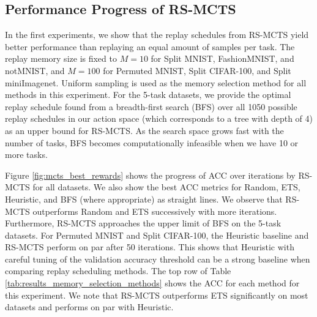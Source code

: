 
%


\subsection{Performance Progress of RS-MCTS}\label{paperC:sec:results_with_mcts}

In the first experiments, we show that the replay schedules from RS-MCTS yield better performance than replaying an equal amount of samples per task. 
The replay memory size is fixed to $M=10$ for Split MNIST, FashionMNIST, and notMNIST, and $M=100$ for Permuted MNIST, Split CIFAR-100, and Split miniImagenet. Uniform sampling is used as the memory selection method for all methods in this experiment.
For the 5-task datasets, we provide the optimal replay schedule found from a breadth-first search (BFS) over all 1050 possible replay schedules in our action space (which corresponds to a tree with depth of 4) as an upper bound for RS-MCTS. As the search space grows fast with the number of tasks, BFS becomes computationally infeasible when we have 10 or more tasks.



Figure \ref{fig:mcts_best_rewards} shows the progress of ACC over %
iterations by RS-MCTS for all datasets. We also show the best ACC metrics for Random, ETS, Heuristic, and BFS (where appropriate) as straight lines. We observe that RS-MCTS outperforms Random and ETS successively with more iterations. Furthermore, RS-MCTS approaches the upper limit of BFS on the 5-task datasets. For Permuted MNIST and Split CIFAR-100, the Heuristic baseline and RS-MCTS perform on par after 50 iterations. This shows that Heuristic with careful tuning of the validation accuracy threshold can be a strong baseline when comparing replay scheduling methods. The top row of Table \ref{tab:results_memory_selection_methods} shows the ACC for each method for this experiment. We note that RS-MCTS outperforms ETS significantly on most datasets and performs on par with Heuristic. 



